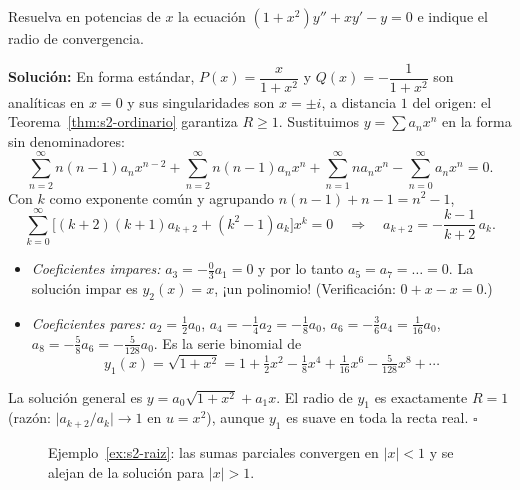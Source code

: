 \begin{example}\label{ex:s2-raiz}
Resuelva en potencias de $x$ la ecuación $(1+x^2)y''+xy'-y=0$ e indique el radio de convergencia.
 
\noindent \textbf{Solución:} \quad En forma estándar, $P(x)=\dfrac{x}{1+x^2}$ y $Q(x)=-\dfrac{1}{1+x^2}$ son analíticas en $x=0$ y sus singularidades son $x=\pm i$, a distancia $1$ del origen: el Teorema~\ref{thm:s2-ordinario} garantiza $R\ge 1$. Sustituimos $y=\sum a_nx^n$ en la forma sin denominadores:
\[ \sum_{n=2}^{\infty} n(n-1)a_nx^{n-2}+\sum_{n=2}^{\infty} n(n-1)a_nx^{n}+\sum_{n=1}^{\infty} n a_nx^{n}-\sum_{n=0}^{\infty} a_nx^{n}=0. \]
Con $k$ como exponente común y agrupando $n(n-1)+n-1=n^2-1$,
\[ \sum_{k=0}^{\infty}\bigl[(k+2)(k+1)a_{k+2}+(k^2-1)a_k\bigr]x^k=0 \quad\Longrightarrow\quad a_{k+2}=-\frac{k-1}{k+2}\,a_k. \]
\begin{itemize}
\item \emph{Coeficientes impares:} $a_3=-\frac{0}{3}a_1=0$ y por lo tanto $a_5=a_7=\dots=0$. La solución impar es $y_2(x)=x$, ¡un polinomio! (Verificación: $0+x-x=0$.)
\item \emph{Coeficientes pares:} $a_2=\frac12a_0$, $a_4=-\frac14a_2=-\frac18a_0$, $a_6=-\frac36a_4=\frac1{16}a_0$, $a_8=-\frac58a_6=-\frac{5}{128}a_0$. Es la serie binomial de
\[ y_1(x)=\sqrt{1+x^2}=1+\tfrac12x^2-\tfrac18x^4+\tfrac1{16}x^6-\tfrac{5}{128}x^8+\cdots \]
\end{itemize}
La solución general es $y=a_0\sqrt{1+x^2}+a_1x$. El radio de $y_1$ es exactamente $R=1$ (razón: $\bigl|a_{k+2}/a_k\bigr|\to 1$ en $u=x^2$), aunque $y_1$ es suave en toda la recta real. \hfill $\square$
\end{example}
 
\begin{figure}[H]
\centering
{}
\caption{Ejemplo~\ref{ex:s2-raiz}: las sumas parciales convergen en $|x|<1$ y se alejan de la solución para $|x|>1$.}
\label{fig:s2-raiz}
\end{figure}
 

